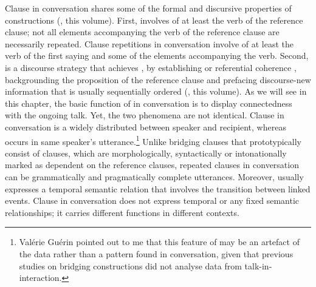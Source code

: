 \documentclass[output=paper]{LSP/langsci}
\begin{document}
Clause  in  conversation shares some of the formal and discursive properties of  constructions (\citealt[cf.][]{guerin18}, this volume). First,  involves  of at least the verb of the reference clause; not all elements accompanying the verb of the reference clause are necessarily repeated. Clause repetitions in  conversation involve  of at least the verb of the first saying and some of the elements accompanying the verb. Second,  is a discourse strategy that achieves , by establishing  or referential coherence \citep{devries.2005}, backgrounding the proposition of the reference clause and prefacing discourse-new information that is usually sequentially ordered (\citealt[][]{guerin18}, this volume). As we will see in this chapter, the basic function of  in  conversation is to display connectedness with the ongoing talk. Yet, the two phenomena are not identical. Clause  in  conversation is a  widely distributed between speaker and recipient, whereas  occurs in same speaker’s utterance.\footnote{Valérie Guérin pointed out to me that this feature of  may be an artefact of the data rather than a pattern found in conversation, given that previous studies on bridging constructions did not analyse data from talk-in-interaction. } Unlike bridging clauses that prototypically consist of clauses, which are morphologically, syntactically or intonationally marked as dependent on the reference clauses, repeated clauses in  conversation can be grammatically and pragmatically complete utterances. Moreover,  usually expresses a temporal semantic relation that involves the transition between linked events. Clause  in  conversation does not express temporal  or any fixed semantic relationships; it carries different functions in different contexts.  
\end{document}
